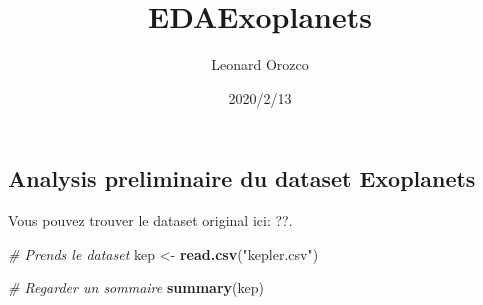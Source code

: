 \documentclass[]{article}
\title{EDAExoplanets}
\author{Leonard Orozco}
\date{2020/2/13}
\newenvironment{Shaded}{\begin{snugshade}}{\end{snugshade}}
\newcommand{\KeywordTok}[1]{\textcolor[rgb]{0.13,0.29,0.53}{\textbf{{#1}}}}
\newcommand{\StringTok}[1]{\textcolor[rgb]{0.31,0.60,0.02}{{#1}}}
\newcommand{\CommentTok}[1]{\textcolor[rgb]{0.56,0.35,0.01}{\textit{{#1}}}}
\newcommand{\NormalTok}[1]{{#1}}
\begin{document}
\maketitle

\subsection{Analysis preliminaire du dataset
Exoplanets}\label{analysis-preliminaire-du-dataset-exoplanets}

Vous pouvez trouver le dataset original ici: ??.

\begin{Shaded}
\begin{Highlighting}[]
\CommentTok{# Prends le dataset }
\NormalTok{kep <-}\StringTok{ }\KeywordTok{read.csv}\NormalTok{(}\StringTok{"kepler.csv"}\NormalTok{)}
\end{Highlighting}
\end{Shaded}

\begin{Shaded}
\begin{Highlighting}[]
\CommentTok{# Regarder un sommaire}
\KeywordTok{summary}\NormalTok{(kep)}
\end{Highlighting}
\end{Shaded}
\end{document}
